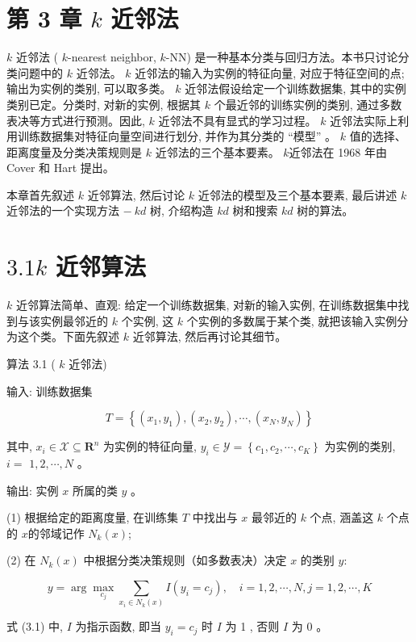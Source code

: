 \documentclass[10pt]{article}
\begin{document}
\section*{第 3 章 $k$ 近邻法}
$k$ 近邻法 ( $k$-nearest neighbor, $k$-NN) 是一种基本分类与回归方法。本书只讨论分类问题中的 $k$ 近邻法。 $k$ 近邻法的输入为实例的特征向量, 对应于特征空间的点; 输出为实例的类别, 可以取多类。 $k$ 近邻法假设给定一个训练数据集, 其中的实例类别已定。分类时, 对新的实例, 根据其 $k$ 个最近邻的训练实例的类别, 通过多数表决等方式进行预测。因此, $k$ 近邻法不具有显式的学习过程。 $k$ 近邻法实际上利用训练数据集对特征向量空间进行划分, 并作为其分类的 “模型” 。 $k$ 值的选择、距离度量及分类决策规则是 $k$ 近邻法的三个基本要素。 $k$近邻法在 1968 年由 Cover 和 Hart 提出。

本章首先叙述 $k$ 近邻算法, 然后讨论 $k$ 近邻法的模型及三个基本要素, 最后讲述 $k$ 近邻法的一个实现方法 $-~ k d$ 树, 介绍构造 $k d$ 树和搜索 $k d$ 树的算法。

\section*{$3.1 k$ 近邻算法}
$k$ 近邻算法简单、直观: 给定一个训练数据集, 对新的输入实例, 在训练数据集中找到与该实例最邻近的 $k$ 个实例, 这 $k$ 个实例的多数属于某个类, 就把该输入实例分为这个类。下面先叙述 $k$ 近邻算法, 然后再讨论其细节。

算法 3.1 ( $k$ 近邻法)

输入: 训练数据集

$$
T=\left\{\left(x_{1}, y_{1}\right),\left(x_{2}, y_{2}\right), \cdots,\left(x_{N}, y_{N}\right)\right\}
$$

其中, $x_{i} \in \mathcal{X} \subseteq \boldsymbol{R}^{n}$ 为实例的特征向量, $y_{i} \in \mathcal{Y}=\left\{c_{1}, c_{2}, \cdots, c_{K}\right\}$ 为实例的类别, $i=$ $1,2, \cdots, N$ 。

输出: 实例 $x$ 所属的类 $y$ 。

(1) 根据给定的距离度量, 在训练集 $T$ 中找出与 $x$ 最邻近的 $k$ 个点, 涵盖这 $k$ 个点的 $x$的邻域记作 $N_{k}(x)$;

(2) 在 $N_{k}(x)$ 中根据分类决策规则（如多数表决）决定 $x$ 的类别 $y:$


\begin{equation*}
y=\arg \max _{c_{j}} \sum_{x_{i} \in N_{k}(x)} I\left(y_{i}=c_{j}\right), \quad i=1,2, \cdots, N, j=1,2, \cdots, K \tag{3.1}
\end{equation*}


式 (3.1) 中, $I$ 为指示函数, 即当 $y_{i}=c_{j}$ 时 $I$ 为 1 , 否则 $I$ 为 0 。
\end{document}
